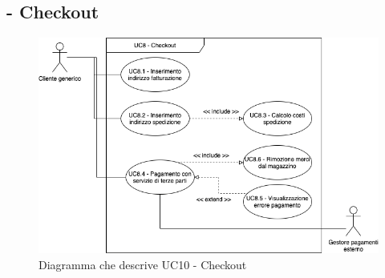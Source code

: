 \stepUserCase
\subsection{ - Checkout}
\begin{figure}[H]
    \centering
    \includegraphics[width=\linewidth]{res/images/UC/UC8.png}
    \caption{Diagramma che descrive UC10 - Checkout}
\end{figure}
